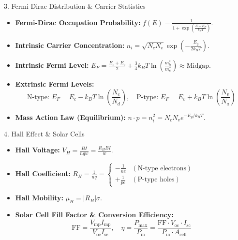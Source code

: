 \begin{formulabox}{3. Fermi-Dirac Distribution \& Carrier Statistics}
\begin{itemize}[leftmargin=*,itemsep=2pt]
    \item \textbf{Fermi-Dirac Occupation Probability:} $f(E) = \frac{1}{1 + \exp\left(\frac{E - E_F}{k_B T}\right)}$.
    \item \textbf{Intrinsic Carrier Concentration:} $n_i = \sqrt{N_c N_v} \exp\left(-\frac{E_g}{2k_B T}\right)$.
    \item \textbf{Intrinsic Fermi Level:} $E_F = \frac{E_c + E_v}{2} + \frac{3}{4}k_B T \ln\left(\frac{m_h^*}{m_e^*}\right) \approx \text{Midgap}$.
    \item \textbf{Extrinsic Fermi Levels:}
    \[
    \text{N-type: } E_F = E_c - k_B T\ln\left(\frac{N_c}{N_d}\right), \quad \text{P-type: } E_F = E_v + k_B T\ln\left(\frac{N_v}{N_a}\right)
    \]
    \item \textbf{Mass Action Law (Equilibrium):} $n \cdot p = n_i^2 = N_c N_v e^{-E_g/k_B T}$.
\end{itemize}
\end{formulabox}

\begin{formulabox}{4. Hall Effect \& Solar Cells}
\begin{itemize}[leftmargin=*,itemsep=2pt]
    \item \textbf{Hall Voltage:} $V_H = \frac{B I}{n q w} = \frac{R_H B I}{w}$.
    \item \textbf{Hall Coefficient:} $R_H = \frac{1}{n q} = \begin{cases} -\frac{1}{n e} & (\text{N-type electrons}) \\ +\frac{1}{p e} & (\text{P-type holes}) \end{cases}$
    \item \textbf{Hall Mobility:} $\mu_H = |R_H| \sigma$.
    \item \textbf{Solar Cell Fill Factor \& Conversion Efficiency:}
    \[
    \text{FF} = \frac{V_{\text{mp}} I_{\text{mp}}}{V_{\text{oc}} I_{\text{sc}}}, \quad \eta = \frac{P_{\text{max}}}{P_{\text{in}}} = \frac{\text{FF} \cdot V_{\text{oc}} \cdot I_{\text{sc}}}{P_{\text{in}} \cdot A_{\text{cell}}}
    \]
\end{itemize}
\end{formulabox}

